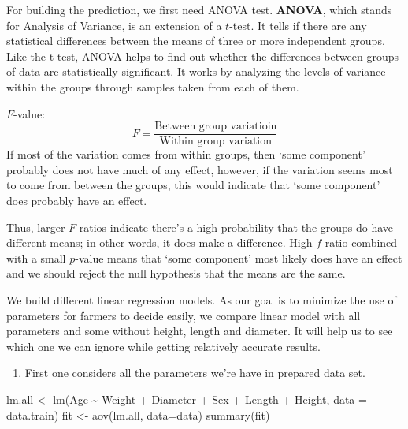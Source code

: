 \documentclass[
]{article}
\newenvironment{Shaded}{\begin{snugshade}}{\end{snugshade}}
\newcommand{\AttributeTok}[1]{\textcolor[rgb]{0.77,0.63,0.00}{#1}}
\newcommand{\FunctionTok}[1]{\textcolor[rgb]{0.00,0.00,0.00}{#1}}
\newcommand{\NormalTok}[1]{#1}
\newcommand{\OtherTok}[1]{\textcolor[rgb]{0.56,0.35,0.01}{#1}}
\newcommand{\SpecialCharTok}[1]{\textcolor[rgb]{0.00,0.00,0.00}{#1}}
\providecommand{\tightlist}{%
  \setlength{\itemsep}{0pt}\setlength{\parskip}{0pt}}
\begin{document}
For building the prediction, we first need ANOVA test. \textbf{ANOVA},
which stands for Analysis of Variance, is an extension of a \(t\)-test.
It tells if there are any statistical differences between the means of
three or more independent groups. Like the t-test, ANOVA helps to find
out whether the differences between groups of data are statistically
significant. It works by analyzing the levels of variance within the
groups through samples taken from each of them.

\(F\)-value:
\[F = \frac{\text{Between group variatioin}}{\text{Within group variation}}\]
If most of the variation comes from within groups, then `some component'
probably does not have much of any effect, however, if the variation
seems most to come from between the groups, this would indicate that
`some component' does probably have an effect.

Thus, larger \(F\)-ratios indicate there's a high probability that the
groups do have different means; in other words, it does make a
difference. High \(f\)-ratio combined with a small \(p\)-value means
that `some component' most likely does have an effect and we should
reject the null hypothesis that the means are the same.

We build different linear regression models. As our goal is to minimize
the use of parameters for farmers to decide easily, we compare linear
model with all parameters and some without height, length and diameter.
It will help us to see which one we can ignore while getting relatively
accurate results.

\begin{enumerate}
\def\labelenumi{\arabic{enumi}.}
\tightlist
\item
  First one considers all the parameters we're have in prepared data
  set.
\end{enumerate}

\begin{Shaded}
\begin{Highlighting}[]
\NormalTok{lm.all }\OtherTok{\textless{}{-}} \FunctionTok{lm}\NormalTok{(Age }\SpecialCharTok{\textasciitilde{}}\NormalTok{ Weight }\SpecialCharTok{+}\NormalTok{ Diameter }\SpecialCharTok{+}\NormalTok{ Sex }\SpecialCharTok{+}\NormalTok{ Length }\SpecialCharTok{+}\NormalTok{ Height, }\AttributeTok{data =}\NormalTok{ data.train)}
\NormalTok{fit }\OtherTok{\textless{}{-}} \FunctionTok{aov}\NormalTok{(lm.all, }\AttributeTok{data=}\NormalTok{data)}
\FunctionTok{summary}\NormalTok{(fit)}
\end{Highlighting}
\end{Shaded}
\end{document}
